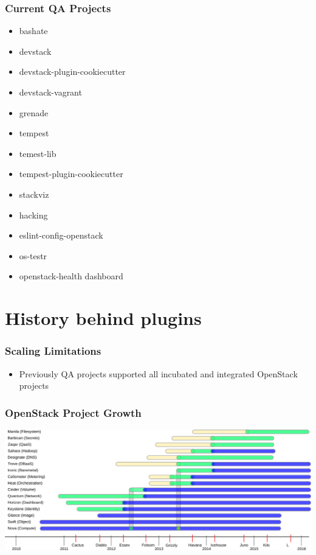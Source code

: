 \documentclass[aspectratio=169,11pt,hyperref={colorlinks=true}]{beamer}
\begin{document}
\begin{frame}
    \frametitle{Current QA Projects}
    \begin{itemize}
    \item{bashate}
    \item{devstack}
    \item{devstack-plugin-cookiecutter}
    \item{devstack-vagrant}
    \item{grenade}
    \item{tempest}
    \item{temest-lib}
    \item{tempest-plugin-cookiecutter}
    \item{stackviz}
    \item{hacking}
    \item{eslint-config-openstack}
    \item{os-testr}
    \item{openstack-health dashboard}
    \end{itemize}
\end{frame}

\section{History behind plugins}
\begin{frame}
    \frametitle{Scaling Limitations}
    \begin{itemize}
        \item Previously QA projects supported all incubated and integrated OpenStack projects
    \end{itemize}
\end{frame}

\begin{frame}
    \frametitle{OpenStack Project Growth}
    \includegraphics[width=\textwidth]{OpenStack_Components.png}
\end{frame}
\end{document}
